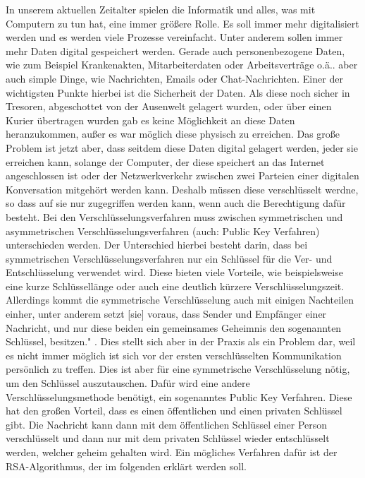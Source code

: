 \documentclass[12pt,a4paper]{scrartcl}
\begin{document}
In unserem aktuellen Zeitalter spielen die Informatik und alles, was mit Computern zu tun hat, eine immer größere Rolle. Es soll immer mehr digitalisiert werden und es werden viele Prozesse vereinfacht. Unter anderem sollen immer mehr Daten digital gespeichert werden. Gerade auch personenbezogene Daten, wie zum Beispiel Krankenakten, Mitarbeiterdaten oder Arbeitsverträge o.ä.. aber auch simple Dinge, wie Nachrichten, Emails oder Chat-Nachrichten. Einer der wichtigsten Punkte hierbei ist die Sicherheit der Daten. Als diese noch sicher in Tresoren, abgeschottet von der Ausenwelt gelagert wurden, oder über einen Kurier übertragen wurden gab es keine Möglichkeit an diese Daten heranzukommen, außer es war möglich diese physisch zu erreichen. Das große Problem ist jetzt aber, dass seitdem diese Daten digital gelagert werden, jeder sie erreichen kann, solange der Computer, der diese speichert an das Internet angeschlossen ist oder der Netzwerkverkehr zwischen zwei Parteien einer digitalen Konversation mitgehört werden kann. Deshalb müssen diese verschlüsselt werdne, so dass auf sie nur zugegriffen werden kann, wenn auch die Berechtigung dafür besteht. 
Bei den Verschlüsselungsverfahren muss zwischen symmetrischen und asymmetrischen Verschlüsselungsverfahren (auch: Public Key Verfahren) unterschieden werden. Der Unterschied hierbei besteht darin, dass bei symmetrischen Verschlüsselungsverfahren nur ein Schlüssel für die Ver- und Entschlüsselung verwendet wird. Diese bieten viele Vorteile, wie beispielsweise eine kurze Schlüssellänge oder auch eine deutlich kürzere Verschlüsselungszeit. Allerdings kommt die symmetrische Verschlüsselung auch mit einigen Nachteilen einher, unter anderem \glqq setzt [sie] voraus, dass Sender und Empfänger einer Nachricht, und nur diese beiden ein gemeinsames
Geheimnis den sogenannten Schlüssel, besitzen." \cite[S.7]{schwenk2010sicherheit}. Dies stellt sich aber in der Praxis als ein Problem dar, weil es nicht immer möglich ist sich vor der ersten verschlüsselten Kommunikation persönlich zu treffen. Dies ist aber für eine symmetrische Verschlüsselung nötig, um den Schlüssel auszutauschen. Dafür wird eine andere Verschlüsselungsmethode benötigt, ein sogenanntes Public Key Verfahren. Diese hat den großen Vorteil, dass es einen öffentlichen und einen privaten Schlüssel gibt. Die Nachricht kann dann mit dem öffentlichen Schlüssel einer Person verschlüsselt und dann nur mit dem privaten Schlüssel wieder entschlüsselt werden, welcher geheim gehalten wird. Ein mögliches Verfahren dafür ist der RSA-Algorithmus, der im folgenden erklärt werden soll.
\end{document}

